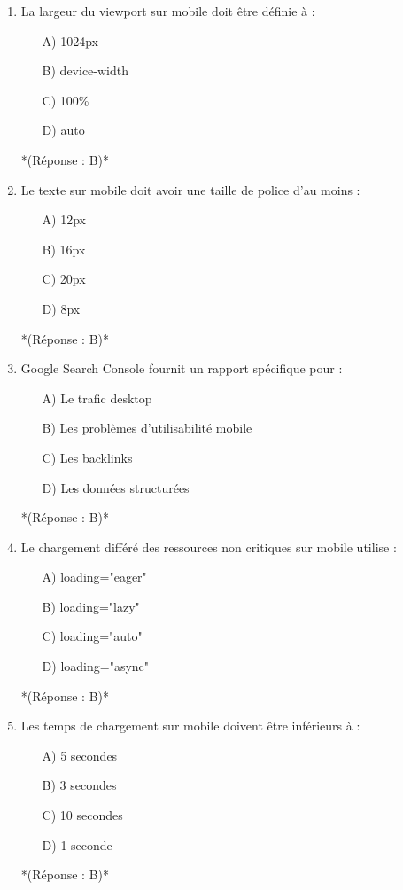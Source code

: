 \documentclass[12pt,a4paper,twoside]{report}
\begin{document}
\begin{enumerate}
\item La largeur du viewport sur mobile doit être définie à :
\begin{itemize}
\item[A)] 1024px
\item[B)] device-width
\item[C)] 100\%
\item[D)] auto
\end{itemize}
*(Réponse : B)*

\item Le texte sur mobile doit avoir une taille de police d'au moins :
\begin{itemize}
\item[A)] 12px
\item[B)] 16px
\item[C)] 20px
\item[D)] 8px
\end{itemize}
*(Réponse : B)*

\item Google Search Console fournit un rapport spécifique pour :
\begin{itemize}
\item[A)] Le trafic desktop
\item[B)] Les problèmes d'utilisabilité mobile
\item[C)] Les backlinks
\item[D)] Les données structurées
\end{itemize}
*(Réponse : B)*

\item Le chargement différé des ressources non critiques sur mobile utilise :
\begin{itemize}
\item[A)] loading="eager"
\item[B)] loading="lazy"
\item[C)] loading="auto"
\item[D)] loading="async"
\end{itemize}
*(Réponse : B)*

\item Les temps de chargement sur mobile doivent être inférieurs à :
\begin{itemize}
\item[A)] 5 secondes
\item[B)] 3 secondes
\item[C)] 10 secondes
\item[D)] 1 seconde
\end{itemize}
*(Réponse : B)*


\end{enumerate}
\end{document}
